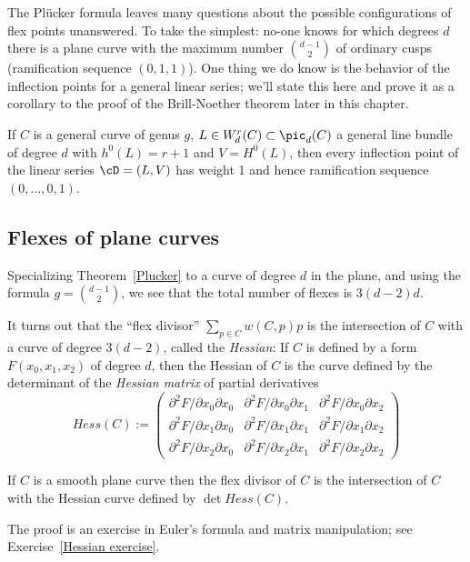 The Pl\"ucker formula leaves many questions about the possible configurations of flex points unanswered. To take the simplest:
no-one knows for which degrees $d$ there is a plane curve with the maximum number ${d-1\choose 2}$ of ordinary cusps (ramification
sequence $(0,1,1)$).  One thing we do know is the behavior of the inflection points for a general linear series; we'll state this here and prove it as a corollary to the proof of the Brill-Noether theorem later in this chapter.

\begin{theorem}\label{Brill Noether Plucker}
If $C$ is a general curve of genus $g$, $L \in W^r_d(C) \subset \pic_d(C)$ a general line bundle of degree $d$ with $h^0(L) = r+1$ and $V = H^0(L)$, then every inflection point of the linear series $\cD = (L, V)$ has weight 1 and hence ramification sequence $(0, \dots, 0, 1)$.
\end{theorem}

\subsection{Flexes of plane curves}\label{plane curve pluecker}

Specializing Theorem~\ref{Plucker} to a curve of degree $d$ in the plane, and using the formula
$g= {d-1\choose 2}$, we see that the total number of flexes is $3(d-2)d$. 

It turns out that the ``flex divisor''
$\sum_{p\in C} w(C, p)p$
is the intersection of $C$ with a curve of degree $3(d-2)$, called the \emph{Hessian}: If $C$ is defined by a form $F(x_0, x_1, x_2)$ of degree $d$, then
the Hessian of $C$ is the curve defined by the determinant of the \emph{Hessian matrix} of partial derivatives
$$
Hess(C) :=
\begin{pmatrix}
 \partial^2 F/\partial x_0 \partial x_0 & \partial^2 F/\partial x_0 \partial x_1 & \partial^2 F/\partial x_0 \partial x_2 \\
\partial^2 F/\partial x_1 \partial x_0 & \partial^2 F/\partial x_1 \partial x_1 & \partial^2 F/\partial x_1 \partial x_2 \\
\partial^2 F/\partial x_2 \partial x_0 & \partial^2 F/\partial x_2 \partial x_1 & \partial^2 F/\partial x_2 \partial x_2 
\end{pmatrix}
$$
\begin{theorem}\label{Hessian} If $C$ is a smooth plane curve then the flex divisor of $C$ is the intersection 
of $C$ with the Hessian curve defined by $\det Hess(C)$.
\end{theorem}
The proof is an exercise in Euler's formula and matrix manipulation; see Exercise~\ref{Hessian exercise}.

